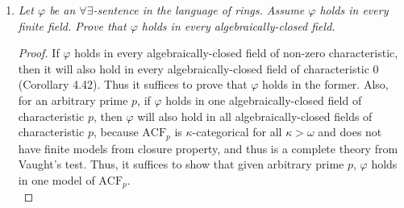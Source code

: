 \documentclass{article}
\begin{document}
\begin{enumerate}[label={\bf Q\arabic*:}]
\begin{enumerate}[label={\bf(\arabic*)}]
\begin{proof}
          Now $T_\text{tor-free}$ is $\kappa$-categorical for all
          $\kappa>\omega$ (Theorem 4.35), so since $T_0$ ensures that there
          are no finite-models, $T_\text{tor-free}$ is a complete theory by
          Vaught's test (Theorem 4.34). \\

          Let $\varphi$ be a sentence in the language such that
          $\mathbb{Q}\models\varphi$. Then
          $T_\text{tor-free}\models\varphi$ from completeness of
          $T_\text{tor-free}$, thus from compactness theorem, there must be
          a finite subset of formulas $T_\text{fin}\subset
          T_\text{tor-free}$ such that $T_\text{fin}\models\varphi$.
          Without loss of generality, we can assume
          \begin{align*}
            T_\text{fin} &= T_\text{Ab}\cup \bigcup_{n=1}^N
              \{\underbrace{x+\ldots+x}_{n\text{-times}}=0 \rightarrow
              x=0\} \cup\bigcup_{n=1}^N
              \{\forall x\exists y\;
              \underbrace{y+\ldots+y}_{n\text{-times}}=x\}. \\
          \end{align*}
          Then by choosing prime $p>N$, we will have $\mathbb{Z}_p\models
          T_\text{fin}$. Then $\mathbb{Z}_p\models\varphi$, as required.
        \end{proof}

      \item Write a sentence $\psi$ such that $\mathbb{Z}\models\psi$ and
        $\mathbb{Q}\models\neg\psi$.
        \begin{proof}
          Let $\psi$ be the sentence that says ``There is an element that
          is not divisible by 2''. Formally,
          \[\psi:= \exists x\forall y\; (y+y\neq x).\]
        \end{proof}
    \end{enumerate}

  \item \it Let $\varphi$ be an $\forall\exists$-sentence in the language
    of rings. Assume $\varphi$ holds in every finite field. Prove that
    $\varphi$ holds in every algebraically-closed field.

    \begin{proof}
      If $\varphi$ holds in every algebraically-closed field of non-zero
      characteristic, then it will also hold in every algebraically-closed
      field of characteristic 0 (Corollary 4.42). Thus it suffices to prove
      that $\varphi$ holds in the former. Also, for an arbitrary prime $p$,
      if $\varphi$ holds in one algebraically-closed field of
      characteristic $p$, then $\varphi$ will also hold in all
      algebraically-closed fields of characteristic $p$, because
      $\text{ACF}_p$ is $\kappa$-categorical for all $\kappa>\omega$ and
      does not have finite models from closure property, and thus is a
      complete theory from Vaught's test. Thus, it suffices to show that
      given arbitrary prime $p$, $\varphi$ holds in one model of
      $\text{ACF}_p$. \\


\end{proof}
\end{enumerate}
\end{document}
